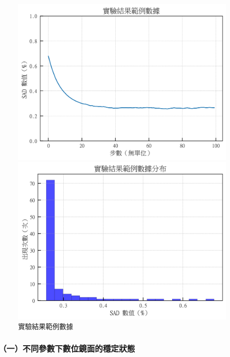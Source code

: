 \documentclass[12pt]{article}
\begin{document}
\begin{figure}[htbp]
  \centering
  \begin{minipage}[b]{0.45\textwidth}
    \centering
    \includegraphics[width=\textwidth]{img/SAD_expriment_example_1.png}
  \end{minipage}
  \hfill
  \begin{minipage}[b]{0.45\textwidth}
    \centering
    \includegraphics[width=\textwidth]{img/SAD_expriment_example_2.png}
  \end{minipage}
  \caption{實驗結果範例數據}\label{fig:test_img2}
\end{figure}

\subsubsection{（一）不同參數下數位鏡面的穩定狀態}
\end{document}
